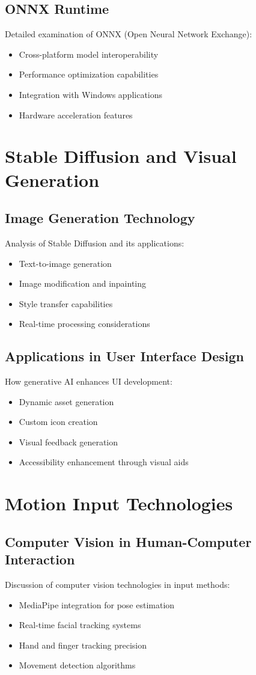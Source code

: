 \subsection{ONNX Runtime}
Detailed examination of ONNX (Open Neural Network Exchange):
\begin{itemize}
    \item Cross-platform model interoperability
    \item Performance optimization capabilities
    \item Integration with Windows applications
    \item Hardware acceleration features
\end{itemize}

\section{Stable Diffusion and Visual Generation}
\subsection{Image Generation Technology}
Analysis of Stable Diffusion and its applications:
\begin{itemize}
    \item Text-to-image generation
    \item Image modification and inpainting
    \item Style transfer capabilities
    \item Real-time processing considerations
\end{itemize}

\subsection{Applications in User Interface Design}
How generative AI enhances UI development:
\begin{itemize}
    \item Dynamic asset generation
    \item Custom icon creation
    \item Visual feedback generation
    \item Accessibility enhancement through visual aids
\end{itemize}

\section{Motion Input Technologies}
\subsection{Computer Vision in Human-Computer Interaction}
Discussion of computer vision technologies in input methods:
\begin{itemize}
    \item MediaPipe integration for pose estimation
    \item Real-time facial tracking systems
    \item Hand and finger tracking precision
    \item Movement detection algorithms
\end{itemize}

